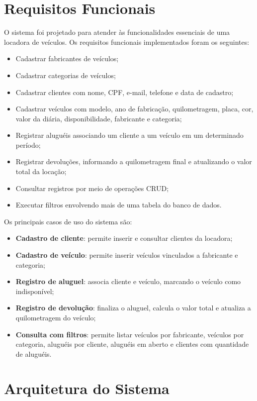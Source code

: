 \documentclass[12pt]{article}
\begin{document}
\section{Requisitos Funcionais}

O sistema foi projetado para atender às funcionalidades essenciais de uma locadora de veículos. Os requisitos funcionais implementados foram os seguintes:

\begin{itemize}
\item Cadastrar fabricantes de veículos;
\item Cadastrar categorias de veículos;
\item Cadastrar clientes com nome, CPF, e-mail, telefone e data de cadastro;
\item Cadastrar veículos com modelo, ano de fabricação, quilometragem, placa, cor, valor da diária, disponibilidade, fabricante e categoria;
\item Registrar aluguéis associando um cliente a um veículo em um determinado período;
\item Registrar devoluções, informando a quilometragem final e atualizando o valor total da locação;
\item Consultar registros por meio de operações CRUD;
\item Executar filtros envolvendo mais de uma tabela do banco de dados.
\end{itemize}

Os principais casos de uso do sistema são:

\begin{itemize}
\item \textbf{Cadastro de cliente}: permite inserir e consultar clientes da locadora;
\item \textbf{Cadastro de veículo}: permite inserir veículos vinculados a fabricante e categoria;
\item \textbf{Registro de aluguel}: associa cliente e veículo, marcando o veículo como indisponível;
\item \textbf{Registro de devolução}: finaliza o aluguel, calcula o valor total e atualiza a quilometragem do veículo;
\item \textbf{Consulta com filtros}: permite listar veículos por fabricante, veículos por categoria, aluguéis por cliente, aluguéis em aberto e clientes com quantidade de aluguéis.
\end{itemize}

\section{Arquitetura do Sistema}
\end{document}

